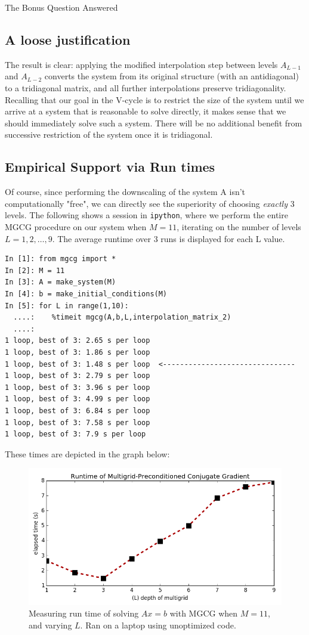 \documentclass[10pt]{article}
\theoremstyle{definition}
\begin{document}
\begin{section}{The Bonus Question Answered}
\subsection{A loose justification}
The result is clear: applying the modified interpolation step between levels $A_{L-1}$ and $A_{L-2}$ converts the system from its original structure (with an antidiagonal) to a tridiagonal matrix, and all further interpolations preserve tridiagonality. Recalling that our goal in the V-cycle is to restrict the size of the system until we arrive at a system that is reasonable to solve directly, it makes sense that we should immediately solve such a system. There will be no additional benefit from successive restriction of the system once it is tridiagonal.


\clearpage
\subsection{Empirical Support via Run times}
Of course, since performing the downscaling of the system A isn't computationally "free", we can directly see the superiority of choosing \textit{exactly} 3 levels. The following shows a session in \texttt{ipython}, where we perform the entire MGCG procedure on our system when $M=11$, iterating on the number of levels $L=1,2,\dots,9$. The average runtime over 3 runs is displayed for each L value. 

\begin{verbatim}
In [1]: from mgcg import * 
In [2]: M = 11
In [3]: A = make_system(M)
In [4]: b = make_initial_conditions(M)
In [5]: for L in range(1,10):
  ....:    %timeit mgcg(A,b,L,interpolation_matrix_2)
  ....:     
1 loop, best of 3: 2.65 s per loop
1 loop, best of 3: 1.86 s per loop
1 loop, best of 3: 1.48 s per loop	<-------------------------------
1 loop, best of 3: 2.79 s per loop
1 loop, best of 3: 3.96 s per loop
1 loop, best of 3: 4.99 s per loop
1 loop, best of 3: 6.84 s per loop
1 loop, best of 3: 7.58 s per loop
1 loop, best of 3: 7.9 s per loop
\end{verbatim}

These times are depicted in the graph below:
\begin{figure}[h]
\begin{center}
\includegraphics[width=0.8\linewidth]{runtimes.png}
\caption{Measuring run time of solving $Ax=b$ with MGCG when $M=11$, and varying $L$. Ran on a laptop using unoptimized code.}
\end{center}
\end{figure}


\end{section}
\end{document}
